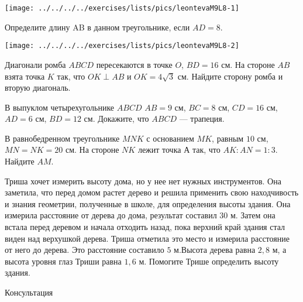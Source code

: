 \begin{class}[number=8]
\begin{listofex}
\begin{minipage}[t]{\picwidth}
			\texttt{[image: ../../../../exercises/lists/pics/leontevaM9L8-1]}
		\end{minipage}
		\item 
		\begin{minipage}[t]{\bodywidth}
			Определите длину AB в данном треугольнике, если \( AD=8 \).
		\end{minipage}
		\hspace{0.02\linewidth}
		\begin{minipage}[t]{\picwidth}
			\texttt{[image: ../../../../exercises/lists/pics/leontevaM9L8-2]}
		\end{minipage}
		\item Диагонали ромба \( ABCD \) пересекаются в точке \( O \), \( BD = 16 \) см. На стороне \( AB \) взята точка \( K \) так, что \( OK \perp AB \) и \( OK = 4\sqrt{3} \) см. Найдите сторону ромба и вторую диагональ.
		\item В выпуклом четырехугольнике \( ABCD \) \( AB = 9 \) см, \( BC = 8 \) см, \( CD = 16 \) см, \( AD = 6 \) см, \( BD = 12 \) см. Докажите, что \( ABCD \) --- трапеция.
		\item  В равнобедренном треугольнике \( MNK \) с основанием \( MK \), равным \( 10 \) см, \( MN = NK = 20 \) см. На стороне \( NK \) лежит точка \( А \) так, что \( AK : AN =1 : 3 \). Найдите \( AM \).
		\item Триша хочет измерить высоту дома, но у нее нет нужных инструментов. Она заметила, что перед домом растет дерево и решила применить свою находчивость и знания геометрии, полученные в школе, для определения высоты здания. Она измерила расстояние от дерева до дома, результат составил \( 30 \) м. Затем она встала перед деревом и начала отходить назад, пока верхний край здания стал виден над верхушкой дерева. Триша отметила это место и измерила расстояние от него до дерева. Это расстояние составило \( 5 \) м.Высота дерева равна \( 2,8 \) м, а высота уровня глаз Триши равна \( 1,6 \) м. Помогите Трише определить высоту здания.
		
	\end{listofex}
\end{class}

\begin{consultation}[number=7]
	\begin{listofex}
		\item Консультация
	\end{listofex}
\end{consultation}
